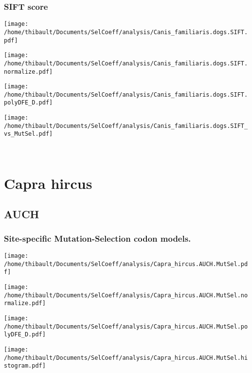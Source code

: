 \subsubsection*{SIFT score} 
\begin{minipage}{0.49\linewidth} 
\texttt{[image: /home/thibault/Documents/SelCoeff/analysis/Canis\_familiaris.dogs.SIFT.pdf]} 
\end{minipage}
\begin{minipage}{0.49\linewidth} 
\texttt{[image: /home/thibault/Documents/SelCoeff/analysis/Canis\_familiaris.dogs.SIFT.normalize.pdf]} 
\end{minipage}
\begin{minipage}{0.49\linewidth} 
\texttt{[image: /home/thibault/Documents/SelCoeff/analysis/Canis\_familiaris.dogs.SIFT.polyDFE\_D.pdf]} 
\end{minipage}
\begin{minipage}{0.49\linewidth} 
\texttt{[image: /home/thibault/Documents/SelCoeff/analysis/Canis\_familiaris.dogs.SIFT\_vs\_MutSel.pdf]} 
\end{minipage}
\\ 
\section{Capra hircus} 
 
\subsection{AUCH} 
 
\subsubsection*{Site-specific Mutation-Selection codon models.} 
\begin{minipage}{0.49\linewidth} 
\texttt{[image: /home/thibault/Documents/SelCoeff/analysis/Capra\_hircus.AUCH.MutSel.pdf]} 
\end{minipage}
\begin{minipage}{0.49\linewidth} 
\texttt{[image: /home/thibault/Documents/SelCoeff/analysis/Capra\_hircus.AUCH.MutSel.normalize.pdf]} 
\end{minipage}
\begin{minipage}{0.49\linewidth} 
\texttt{[image: /home/thibault/Documents/SelCoeff/analysis/Capra\_hircus.AUCH.MutSel.polyDFE\_D.pdf]} 
\end{minipage}
\begin{minipage}{0.49\linewidth} 
\texttt{[image: /home/thibault/Documents/SelCoeff/analysis/Capra\_hircus.AUCH.MutSel.histogram.pdf]} 
\end{minipage}
\\ 
